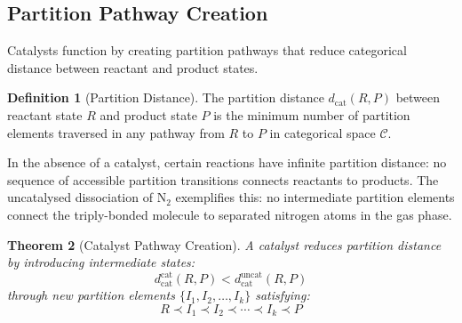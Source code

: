 \documentclass[twocolumn,10pt,a4paper]{article}
\newtheorem{theorem}{Theorem}[section]
\theoremstyle{definition}
\newtheorem{definition}[theorem]{Definition}
\theoremstyle{remark}
\newcommand{\catspace}{\mathcal{C}}
\newcommand{\dcat}{d_{\mathrm{cat}}}
\begin{document}
\subsection{Partition Pathway Creation}

Catalysts function by creating partition pathways that reduce categorical distance between reactant and product states.

\begin{definition}[Partition Distance]
\label{def:partition_dist}
The partition distance $\dcat(R, P)$ between reactant state $R$ and product state $P$ is the minimum number of partition elements traversed in any pathway from $R$ to $P$ in categorical space $\catspace$.
\end{definition}

In the absence of a catalyst, certain reactions have infinite partition distance: no sequence of accessible partition transitions connects reactants to products. The uncatalysed dissociation of N$_2$ exemplifies this: no intermediate partition elements connect the triply-bonded molecule to separated nitrogen atoms in the gas phase.

\begin{theorem}[Catalyst Pathway Creation]
\label{thm:pathway_creation}
A catalyst reduces partition distance by introducing intermediate states:
\begin{equation}
\dcat^{\mathrm{cat}}(R, P) < \dcat^{\mathrm{uncat}}(R, P)
\end{equation}
through new partition elements $\{I_1, I_2, \ldots, I_k\}$ satisfying:
\begin{equation}
R \prec I_1 \prec I_2 \prec \cdots \prec I_k \prec P
\end{equation}
\end{theorem}
\end{document}
